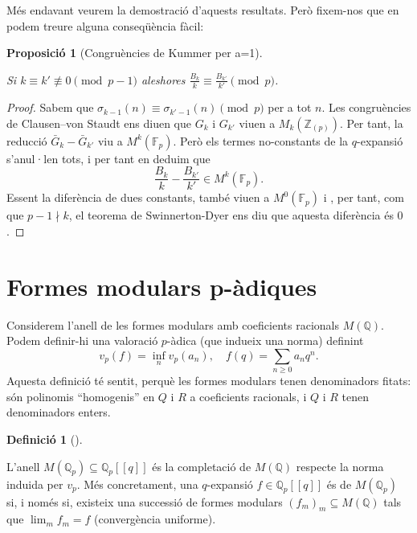 \documentclass[
  letterpaper,
  DIV=11,
  numbers=noendperiod]{scrreprt}
\theoremstyle{plain}
\theoremstyle{plain}
\theoremstyle{definition}
\newtheorem{definition}{Definició}[chapter]
\theoremstyle{plain}
\newtheorem{proposition}{Proposició}[chapter]
\theoremstyle{plain}
\theoremstyle{definition}
\theoremstyle{remark}
\begin{document}
Més endavant veurem la demostració d'aquests resultats. Però fixem-nos
que en podem treure alguna conseqüència fàcil:

\begin{proposition}[Congruències de Kummer per
a=1]\protect\hypertarget{prp-kummer}{}\label{prp-kummer}

Si \(k\equiv k'\not\equiv 0\pmod{p-1}\) aleshores
\(\frac{B_k}{k} \equiv \frac{B_{k'}}{k'}\pmod p\).

\end{proposition}

\begin{proof}
Sabem que \(\sigma_{k-1}(n)\equiv \sigma_{k'-1}(n)\pmod{p}\) per a tot
\(n\). Les congruències de Clausen--von Staudt ens diuen que \(G_k\) i
\(G_{k'}\) viuen a \(M_k(\mathbb{Z}_{(p)})\). Per tant, la reducció
\(\bar G_k - \bar G_{k'}\) viu a \(M^k(\mathbb{F}_p)\). Però els termes
no-constants de la \(q\)-expansió s'anul·len tots, i per tant en deduim
que \[
\frac{B_k}{k} - \frac{B_{k'}}{k'} \in M^{k}(\mathbb{F}_p).
\] Essent la diferència de dues constants, també viuen a
\(M^0(\mathbb{F}_p)\) i , per tant, com que \(p-1\nmid k\), el teorema
de Swinnerton-Dyer ens diu que aquesta diferència és \(0\).
\end{proof}

\section{Formes modulars p-àdiques}\label{formes-modulars-p-uxe0diques}

Considerem l'anell de les formes modulars amb coeficients racionals
\(M(\mathbb{Q})\). Podem definir-hi una valoració \(p\)-àdica (que
indueix una norma) definint \[
v_p(f) = \inf_{n} v_p(a_n),\quad f(q) = \sum_{n\geq 0}a_nq^n.
\] Aquesta definició té sentit, perquè les formes modulars tenen
denominadors fitats: són polinomis ``homogenis'' en \(Q\) i \(R\) a
coeficients racionals, i \(Q\) i \(R\) tenen denominadors enters.

\begin{definition}[]\protect\hypertarget{def-anell-formes-modulars}{}\label{def-anell-formes-modulars}

L'anell \(M(\mathbb{Q}_p)\subseteq \mathbb{Q}_p[[q]]\) és la completació
de \(M(\mathbb{Q})\) respecte la norma induida per \(v_p\). Més
concretament, una \(q\)-expansió \(f\in \mathbb{Q}_p[[q]]\) és de
\(M(\mathbb{Q}_p)\) si, i només si, existeix una successió de formes
modulars \((f_m)_m\subseteq M(\mathbb{Q})\) tals que \(\lim_m f_m= f\)
(convergència uniforme).

\end{definition}
\end{document}
